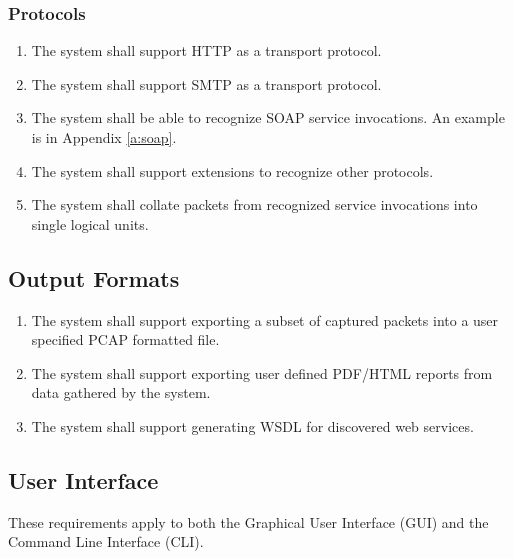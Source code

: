 \documentclass[titlepage]{article}
\begin{document}
\subsubsection{Protocols}
\begin{enumerate}
    \item The system shall support HTTP as a transport protocol.
    \item The system shall support SMTP as a transport protocol.
    \item The system shall be able to recognize SOAP service invocations.  An
        example is in Appendix \ref{a:soap}.
    \item The system shall support extensions to recognize other protocols.
    \item The system shall collate packets from recognized service invocations
        into single logical units.
\end{enumerate}


\subsection{Output Formats%
  \label{output-formats}%
}

\begin{enumerate}
    \item The system shall support exporting a subset of captured packets into
        a user specified PCAP formatted file.
    \item The system shall support exporting user defined PDF/HTML reports from
        data gathered by the system.
    \item The system shall support generating WSDL for discovered web services.
\end{enumerate}

\subsection{User Interface%
  \label{user-interface}%
}

These requirements apply to both the Graphical User Interface (GUI) and the
Command Line Interface (CLI).
\end{document}
